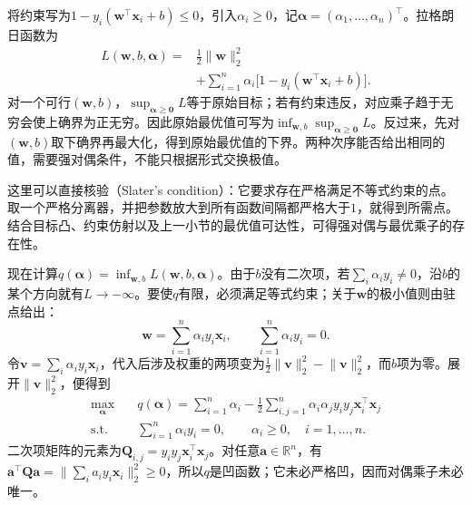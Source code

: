 将约束写为$1-y_i(\bm{w}^{\top}\bm{x}_i+b)\le0$，引入$\alpha_i\ge0$，记$\bm{\alpha}=(\alpha_1,\ldots,\alpha_n)^{\top}$。拉格朗日函数为
\begin{equation}
  \begin{aligned}
    L(\bm{w},b,\bm{\alpha})
    ={}&\frac12\lVert\bm{w}\rVert_2^2\\
      &+\sum_{i=1}^n\alpha_i
        \bigl[1-y_i(\bm{w}^{\top}\bm{x}_i+b)\bigr].
  \end{aligned}
  \label{eq:classification-svm-hard-lagrangian}
\end{equation}
对一个可行$(\bm{w},b)$，$\sup_{\bm{\alpha}\ge\bm{0}}L$等于原始目标；若有约束违反，对应乘子趋于无穷会使上确界为正无穷。因此原始最优值可写为$\inf_{\bm{w},b}\sup_{\bm{\alpha}\ge\bm{0}}L$。反过来，先对$(\bm{w},b)$取下确界再最大化，得到原始最优值的下界。两种次序能否给出相同的值，需要强对偶条件，不能只根据形式交换极值。

这里可以直接核验（Slater's condition）：它要求存在严格满足不等式约束的点。取一个严格分离器，并把参数放大到所有函数间隔都严格大于$1$，就得到所需点。结合目标凸、约束仿射以及上一小节的最优值可达性，可得强对偶与最优乘子的存在性。

现在计算$q(\bm{\alpha})=\inf_{\bm{w},b}L(\bm{w},b,\bm{\alpha})$。由于$b$没有二次项，若$\sum_i\alpha_i y_i\ne0$，沿$b$的某个方向就有$L\to-\infty$。要使$q$有限，必须满足等式约束；关于$\bm{w}$的极小值则由驻点给出：
\begin{equation}
  \bm{w}=\sum_{i=1}^n\alpha_i y_i\bm{x}_i,
  \qquad
  \sum_{i=1}^n\alpha_i y_i=0.
  \label{eq:classification-svm-stationarity}
\end{equation}
令$\bm{v}=\sum_i\alpha_i y_i\bm{x}_i$，代入后涉及权重的两项变为$\frac12\lVert\bm{v}\rVert_2^2-\lVert\bm{v}\rVert_2^2$，而$b$项为零。展开$\lVert\bm{v}\rVert_2^2$，便得到
\begin{equation}
  \begin{aligned}
    \max_{\bm{\alpha}}\quad&
      q(\bm{\alpha})
      =\sum_{i=1}^n\alpha_i
       -\frac12\sum_{i,j=1}^n
          \alpha_i\alpha_j y_i y_j
          \bm{x}_i^{\top}\bm{x}_j\\
    \text{s.t.}\quad&
      \sum_{i=1}^n\alpha_i y_i=0,\qquad
      \alpha_i\ge0,\quad i=1,\ldots,n.
  \end{aligned}
  \label{eq:classification-svm-hard-dual}
\end{equation}
二次项矩阵的元素为$\bm{Q}_{i,j}=y_i y_j\bm{x}_i^{\top}\bm{x}_j$。对任意$\bm{a}\in\mathbb{R}^n$，有$\bm{a}^{\top}\bm{Q}\bm{a}=\lVert\sum_i a_i y_i\bm{x}_i\rVert_2^2\ge0$，所以$q$是凹函数；它未必严格凹，因而对偶乘子未必唯一。

